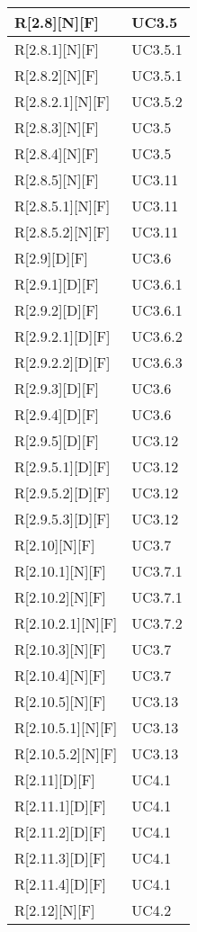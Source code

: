 \begin{longtable}{X | X}
\hline
R[2.8][N][F] & UC3.5 \\
\hline
R[2.8.1][N][F] & UC3.5.1 \\
\hline
R[2.8.2][N][F] & UC3.5.1 \\
\hline
R[2.8.2.1][N][F] & UC3.5.2 \\
\hline
R[2.8.3][N][F] & UC3.5 \\
\hline
R[2.8.4][N][F] & UC3.5 \\
\hline
R[2.8.5][N][F] & UC3.11 \\
\hline
R[2.8.5.1][N][F] & UC3.11 \\
\hline
R[2.8.5.2][N][F] & UC3.11 \\
\hline
R[2.9][D][F] & UC3.6 \\
\hline
R[2.9.1][D][F] & UC3.6.1 \\
\hline
R[2.9.2][D][F] & UC3.6.1 \\
\hline
R[2.9.2.1][D][F] & UC3.6.2 \\
\hline
R[2.9.2.2][D][F] & UC3.6.3 \\
\hline
R[2.9.3][D][F] & UC3.6 \\
\hline
R[2.9.4][D][F] & UC3.6 \\
\hline
R[2.9.5][D][F] & UC3.12 \\
\hline
R[2.9.5.1][D][F] & UC3.12 \\
\hline
R[2.9.5.2][D][F] & UC3.12 \\
\hline
R[2.9.5.3][D][F] & UC3.12 \\
\hline
R[2.10][N][F] & UC3.7 \\
\hline
R[2.10.1][N][F] & UC3.7.1 \\
\hline
R[2.10.2][N][F] & UC3.7.1 \\
\hline
R[2.10.2.1][N][F] & UC3.7.2 \\
\hline
R[2.10.3][N][F] & UC3.7 \\
\hline
R[2.10.4][N][F] & UC3.7 \\
\hline
R[2.10.5][N][F] & UC3.13 \\
\hline
R[2.10.5.1][N][F] & UC3.13 \\
\hline
R[2.10.5.2][N][F] & UC3.13 \\
\hline
R[2.11][D][F] & UC4.1 \\
\hline
R[2.11.1][D][F] & UC4.1 \\
\hline
R[2.11.2][D][F] & UC4.1 \\
\hline
R[2.11.3][D][F] & UC4.1 \\
\hline
R[2.11.4][D][F] & UC4.1 \\
\hline
R[2.12][N][F] & UC4.2 \\

\end{longtable}
